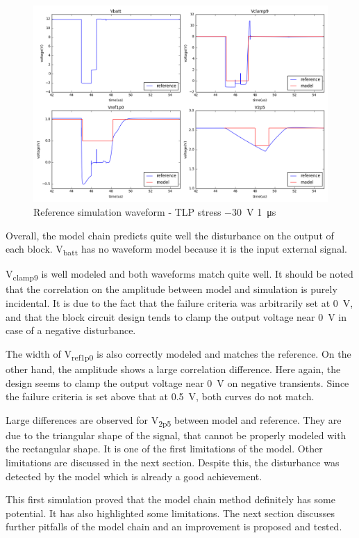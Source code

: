 \begin{figure}[!h]
  \centering
  \includegraphics[width=\textwidth]{src/4/figures/total_simulation_30V_1u.png}
  \caption{Reference simulation waveform - TLP stress \SI{-30}{\volt} \SI{1}{\micro\second}}
  \label{fig:reference_simu}
\end{figure}

Overall, the model chain predicts quite well the disturbance on the output of each block.
V\textsubscript{batt} has no waveform model because it is the input external signal.

V\textsubscript{clamp9} is well modeled and both waveforms match quite well.
It should be noted that the correlation on the amplitude between model and simulation is purely incidental.
It is due to the fact that the failure criteria was arbitrarily set at \SI{0}{\volt}, and that the block circuit design tends to clamp the output voltage near \SI{0}{\volt} in case of a negative disturbance.

The width of V\textsubscript{ref1p0} is also correctly modeled and matches the reference.
On the other hand, the amplitude shows a large correlation difference.
Here again, the design seems to clamp the output voltage near \SI{0}{\volt} on negative transients.
Since the failure criteria is set above that at \SI{0.5}{\volt}, both curves do not match.

Large differences are observed for V\textsubscript{2p5} between model and reference.
They are due to the triangular shape of the signal, that cannot be properly modeled with the rectangular shape.
It is one of the first limitations of the model.
Other limitations are discussed in the next section.
Despite this, the disturbance was detected by the model which is already a good achievement.

This first simulation proved that the model chain method definitely has some potential.
It has also highlighted some limitations.
The next section discusses further pitfalls of the model chain and an improvement is proposed and tested.
